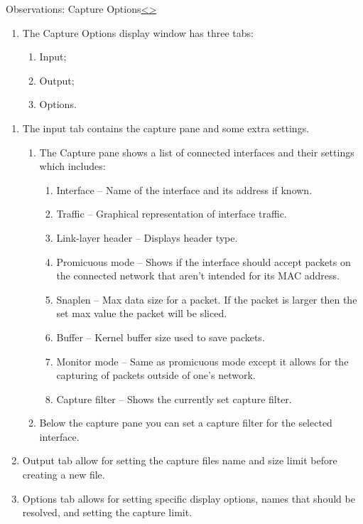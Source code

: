 \documentclass[12pt]{extarticle}
\newenvironment{instructionblock}{\Large\bgroup}{\egroup}
\newcommand{\ben}{\begin{enumerate}}
\newcommand{\een}{\end{enumerate}}
\begin{document}
	
	
	
	\pagebreak
	\begin{slide}{Observations: Capture Options}{\hyperref[slide 25]{\textless}\hyperref[slide 27]{\textgreater}}
		\begin{instructionblock}
			\begin{enumerate}
				\item The Capture Options display window has three tabs:
				\ben
					\item Input;
					\item Output; 
					\item Options. 
				\een
			\end{enumerate}
		\end{instructionblock}
	\end{slide}
	\vspace{4mm}
	\begin{enumerate}
		\item The input tab contains the capture pane and some extra settings.
		\ben
			\item The Capture pane shows a list of connected interfaces and their settings which includes:
			\ben
				\item Interface -- Name of the interface and its address if known.
				\item Traffic -- Graphical representation of interface traffic.
				\item Link-layer header -- Displays header type.
				\item Promicuous mode -- Shows if the interface should accept packets on the connected network that aren't intended for its MAC address. \cite{capture_options}
				\item Snaplen -- Max data size for a packet. If the packet is larger then the set max value the packet will be sliced. \cite{capture_options}
				\item Buffer -- Kernel buffer size used to save packets. \cite{capture_options}
				\item Monitor mode -- Same as promicuous mode except it allows for the capturing of packets outside of one's network. \cite{capture_options}
				\item Capture filter -- Shows the currently set capture filter.
			\een
			\item Below the capture pane you can set a capture filter for the selected interface.
		\een
		\item Output tab allow for setting the capture files name and size limit before creating a new file.
		\item Options tab allows for setting specific display options, names that should be resolved, and setting the capture limit.
	\end{enumerate} 
	
\end{document}
